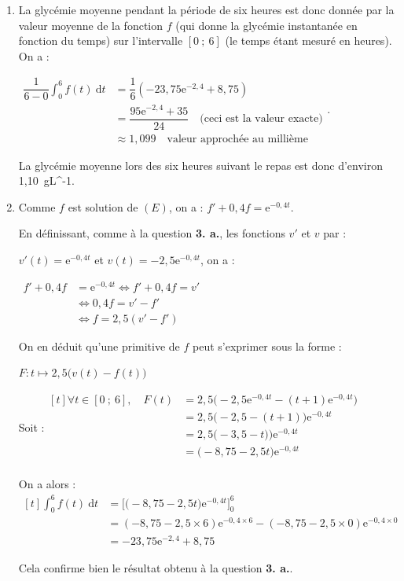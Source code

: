 \documentclass[10pt]{article}
\providecommand{\e}{{\mathrm{e}}}
\providecommand{\np}[2][]{{#2~#1}}
\begin{document}
\begin{enumerate}
\begin{enumerate}
\item La glycémie moyenne pendant la période de six heures est donc donnée par la valeur moyenne de la fonction $f$ (qui donne la glycémie instantanée en fonction du temps) sur l'intervalle $[0 ~;~ 6]$ (le temps étant mesuré en heures). On a :

$\begin{aligned}
\dfrac{1}{6-0}\displaystyle\int_0^6 f(t)\: \text{d}t
	&= \dfrac{1}{6}(-23,75\e^{-2,4} + 8,75) \\
	&= \dfrac{95\e^{-2,4} + 35}{24} \quad \text{(ceci est la valeur exacte)}\\
	&\approx 1,099 \quad \text{valeur approchée au millième }
\end{aligned}$.

La glycémie moyenne lors des six heures suivant le repas est donc d'environ \np[g\cdot L^{-1}]{1,10}.

\item Comme $f$ est solution de $(E)$, on a : $f' + 0,4f = \e^{-0,4t}$.

En définissant, comme à la question \textbf{3. a.}, les fonctions $v'$ et $v$ par :

$v'(t) =\e^{-0,4t}$ et $v(t) = -2,5\e^{-0,4t}$, on a :

$\begin{aligned}
f' + 0,4f &= \e^{-0,4t} \iff f' + 0,4f = v'\\
	&\iff 0,4f = v'  - f'\\
	&\iff f = 2,5 (v' - f')
\end{aligned}$

On en déduit qu'une primitive de $f$ peut s'exprimer sous la forme :

$F : t \longmapsto 2,5\big(v(t) - f(t)\big)$

Soit :\quad $\begin{aligned}[t]
\forall t \in [0~;~6],\quad F(t) &= 2,5\big(-2,5\e^{-0,4t} - (t+1)\e^{-0,4t}\big)\\
	&= 2,5\big(-2,5 - (t+1)\big)\e^{-0,4t}\\
	&= 2,5\big(-3,5 - t)\big)\e^{-0,4t}\\
	&= \big(-8,75 - 2,5t\big)\e^{-0,4t}\\
\end{aligned}$

On a alors : \quad $\begin{aligned}[t]
\displaystyle\int_0^6 f(t)\: \text{d}t
	&= \Big[\big(-8,75 - 2,5t\big)\e^{-0,4t}\Big]_0^6\\
	&= \left(-8,75 - 2,5\times 6\right)\e^{-0,4\times 6}  - \left(-8,75 - 2,5\times 0\right)\e^{-0,4\times 0}\\
	&= -23,75\e^{-2,4} + 8,75
\end{aligned}$

Cela confirme bien le résultat obtenu à la question \textbf{3. a.}.
	\end{enumerate}
\end{enumerate}
\end{document}
